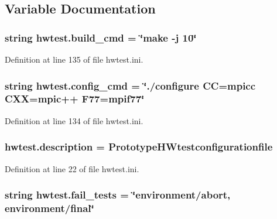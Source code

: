 \subsection{Variable Documentation}
\hypertarget{namespacehwtest_a5378e5bba23994a3a52c3381e619b18b}{
\subsubsection[{build\-\_\-cmd}]{\setlength{\rightskip}{0pt plus 5cm}string hwtest.\-build\-\_\-cmd = \char`\"{}make -\/j 10\char`\"{}}}\label{namespacehwtest_a5378e5bba23994a3a52c3381e619b18b}


Definition at line 135 of file hwtest.\-ini.

\hypertarget{namespacehwtest_aae03e4589fc182736e73d50bbb74346e}{
\subsubsection[{config\-\_\-cmd}]{\setlength{\rightskip}{0pt plus 5cm}string hwtest.\-config\-\_\-cmd = \char`\"{}./configure C\-C=mpicc C\-X\-X=mpic++ F77=mpif77\char`\"{}}}\label{namespacehwtest_aae03e4589fc182736e73d50bbb74346e}


Definition at line 134 of file hwtest.\-ini.

\hypertarget{namespacehwtest_a29832146debe207ba418a2c34a72da74}{
\subsubsection[{description}]{\setlength{\rightskip}{0pt plus 5cm}hwtest.\-description = Prototype\-H\-Wtestconfigurationfile}}\label{namespacehwtest_a29832146debe207ba418a2c34a72da74}


Definition at line 22 of file hwtest.\-ini.

\hypertarget{namespacehwtest_ad08296b7abe004e90b638ec9eb5c0c30}{
\subsubsection[{fail\-\_\-tests}]{\setlength{\rightskip}{0pt plus 5cm}string hwtest.\-fail\-\_\-tests = \char`\"{}environment/abort, environment/final\char`\"{}}}\label{namespacehwtest_ad08296b7abe004e90b638ec9eb5c0c30}


